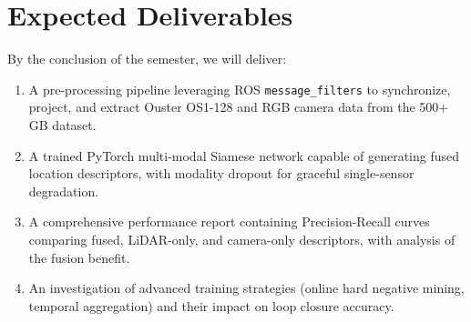 \section{Expected Deliverables}
\label{sec:deliverables}

By the conclusion of the semester, we will deliver:
\begin{enumerate}
    \item A pre-processing pipeline leveraging ROS \texttt{message\_filters} to synchronize, project, and extract Ouster OS1-128 and RGB camera data from the 500+ GB dataset.
    \item A trained PyTorch multi-modal Siamese network capable of generating fused location descriptors, with modality dropout for graceful single-sensor degradation.
    \item A comprehensive performance report containing Precision-Recall curves comparing fused, LiDAR-only, and camera-only descriptors, with analysis of the fusion benefit.
    \item An investigation of advanced training strategies (online hard negative mining, temporal aggregation) and their impact on loop closure accuracy.
\end{enumerate}
